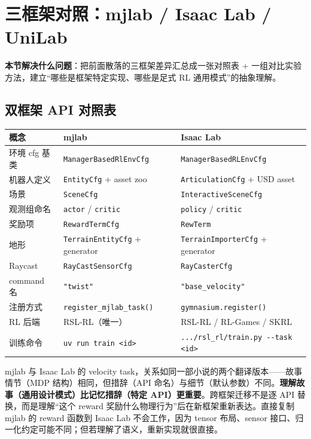 \section{三框架对照：mjlab / Isaac Lab / UniLab}
\label{sec:rlmc-ql-dualframework}

\textbf{本节解决什么问题}：把前面散落的三框架差异汇总成一张对照表 + 一组对比实验方法，建立“哪些是框架特定实现、哪些是足式 RL 通用模式”的抽象理解。

\subsection{双框架 API 对照表}
\label{sec:rlmc-ql-dualframework-api}

\begin{center}
\small
\begin{tabular}{@{}lll@{}}
\toprule
概念 & mjlab & Isaac Lab \\
\midrule
环境 cfg 基类 & \verb|ManagerBasedRlEnvCfg| & \verb|ManagerBasedRLEnvCfg| \\
机器人定义 & \verb|EntityCfg| + asset zoo & \verb|ArticulationCfg| + USD asset \\
场景 & \verb|SceneCfg| & \verb|InteractiveSceneCfg| \\
观测组命名 & \verb|actor| / \verb|critic| & \verb|policy| / \verb|critic| \\
奖励项 & \verb|RewardTermCfg| & \verb|RewTerm| \\
地形 & \verb|TerrainEntityCfg| + generator & \verb|TerrainImporterCfg| + generator \\
Raycast & \verb|RayCastSensorCfg| & \verb|RayCasterCfg| \\
command 名 & \verb|"twist"| & \verb|"base_velocity"| \\
注册方式 & \verb|register_mjlab_task()| & \verb|gymnasium.register()| \\
RL 后端 & RSL-RL（唯一） & RSL-RL / RL-Games / SKRL \\
训练命令 & \verb|uv run train <id>| & \verb|.../rsl_rl/train.py --task <id>| \\
\bottomrule
\end{tabular}
\end{center}

\begin{insight}[同一故事的两个译本]\label{ins:rlmc-ql-translation}
mjlab 与 Isaac Lab 的 velocity task，关系如同一部小说的两个翻译版本——故事情节（MDP 结构）相同，但措辞（API 命名）与细节（默认参数）不同。\textbf{理解故事（通用设计模式）比记忆措辞（特定 API）更重要}。跨框架迁移不是逐 API 替换，而是理解“这个 reward 奖励什么物理行为”后在新框架重新表达。直接复制 mjlab 的 reward 函数到 Isaac Lab 不会工作，因为 tensor 布局、sensor 接口、归一化约定可能不同；但若理解了语义，重新实现就很直接。
\end{insight}

